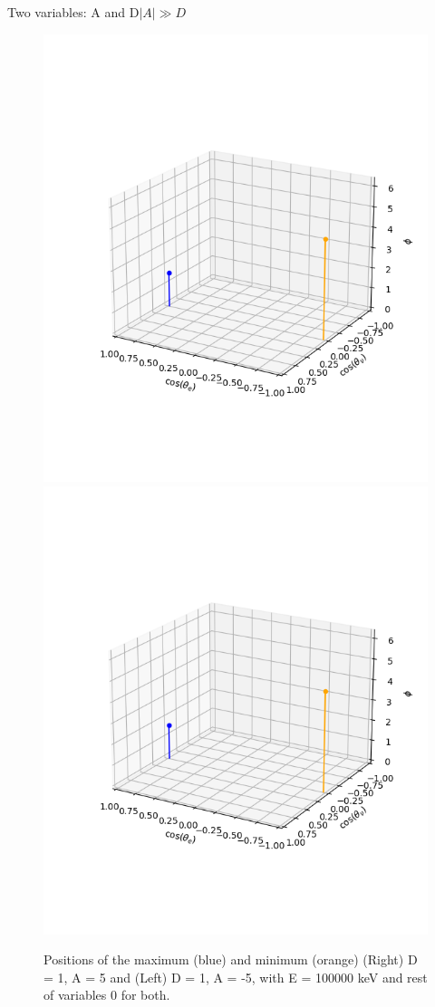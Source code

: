 \documentclass{beamer}
\begin{document}
\begin{frame}{Two variables: A and D}{$|A|\gg D$}
	\begin{figure}
		\centering
		\includegraphics[width=0.4\paperwidth]{plots/posD_xlposA_max_min}
		\includegraphics[width=0.4\paperwidth]{plots/posD_xlposA_max_min}
		\caption{Positions of the maximum (blue) and minimum (orange) (Right) D = 1, A = 5 and (Left) D = 1, A = -5, with E = 100000 keV and rest of variables 0 for both.}
	\end{figure}
\end{frame}
\end{document}
